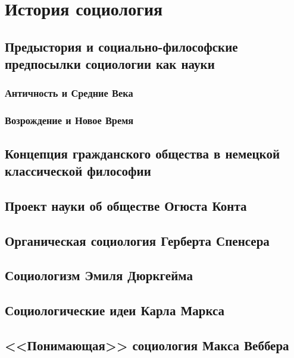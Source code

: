 \chapter{История социология}
\section{Предыстория и социально-философские предпосылки социологии как науки}
\subsection{Античность и Средние Века}

  

\subsection{Возрождение и Новое Время}

\section{Концепция гражданского общества в немецкой классической философии}

\section{Проект науки об обществе Огюста Конта}

\section{Органическая социология Герберта Спенсера}

\section{Социологизм Эмиля Дюркгейма}

\section{Социологические идеи Карла Маркса}

\section{<<Понимающая>> социология Макса Веббера}

